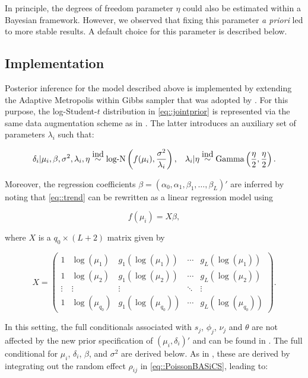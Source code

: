 In principle, the degrees of freedom parameter $\eta$ could also be estimated within a Bayesian framework. However, we observed that fixing this parameter \emph{a priori} led to more stable results. A default choice for this parameter is described below.

\subsection{Implementation}

Posterior inference for the model described above is implemented by extending the Adaptive Metropolis within Gibbs sampler \citep{Roberts2009} that was adopted by \cite{Vallejos2016a}. For this purpose, the log-Student-$t$ distribution in \ref{eq::jointprior} is represented via the same data augmentation scheme as in \cite{Vallejos2015a}. The latter introduces an auxiliary set of parameters $\lambda_i$ such that:

\begin{equation}
\delta_i| \mu_i,\beta,\sigma^2, \lambda_i, \eta \stackrel{\mbox{ind}}{\sim} \textnormal{log-N}\left( f(\mu_i),\frac{\sigma^2}{\lambda_i} \right), \hspace{0.3cm} \lambda_i|\eta \stackrel{\mbox{ind}}{\sim} \text{Gamma}\left(\frac{\eta}{2},\frac{\eta}{2}\right).
\end{equation} 

Moreover, the regression coefficients $\beta = (\alpha_0, \alpha_1, \beta_1, \ldots, \beta_L)'$ are inferred by noting that \ref{eq::trend} can be rewritten as a linear regression model using 

\begin{equation} \label{eq::trend2} f(\mu_i) = X \beta, \end{equation} 

where $X$ is a $q_0 \times (L+2)$ matrix given by 

\begin{equation} \label{eq::X} X = \left( \begin{array}{ccccc}
1 & \log(\mu_1) & g_1(\log(\mu_1)) & \cdots & g_L(\log(\mu_1)) \\
1 & \log(\mu_2) & g_1(\log(\mu_2)) & \cdots & g_L(\log(\mu_2)) \\
\vdots & \vdots & \vdots & \ddots & \vdots  \\
1 & \log(\mu_{q_0}) & g_1(\log(\mu_{q_0})) & \cdots & g_L(\log(\mu_{q_0}))
\end{array}\right).\end{equation}

In this setting, the full conditionals associated with $s_j$, $\phi_j$, $\nu_j$ and $\theta$ are not affected by the new prior specification of $(\mu_i, \delta_i)'$ and can be found in \cite{Vallejos2016a}. The full conditional for $\mu_i$, $\delta_i$, $\beta$, and $\sigma^2$ are derived below. As in \cite{Vallejos2015}, these are derived by integrating out the random effect $\rho_{ij}$ in \ref{eq::PoissonBASiCS}, leading to:

